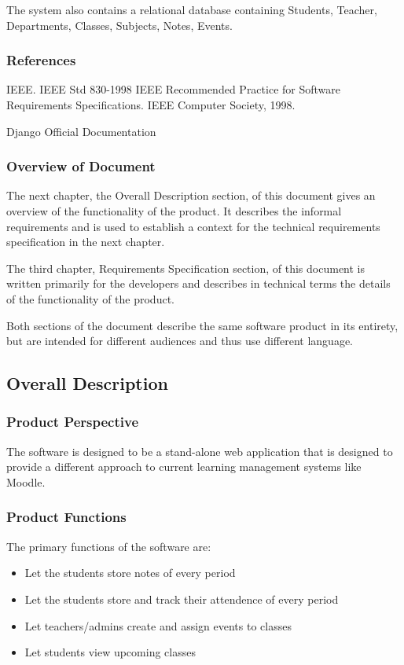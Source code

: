 The system also contains a relational database containing Students, Teacher, Departments, Classes, Subjects, Notes, Events.

\subsubsection{References}
IEEE. IEEE Std 830-1998 IEEE Recommended Practice for Software Requirements Specifications. IEEE Computer Society, 1998.

Django Official Documentation

\subsubsection{Overview of Document}
The next chapter, the Overall Description section, of this document gives an overview of the functionality of the product. It describes the informal requirements and is used to establish a context for the technical requirements specification in the next chapter.

The third chapter, Requirements Specification section, of this document is written primarily for the developers and describes in technical terms the details of the functionality of the product. 

Both sections of the document describe the same software product in its entirety, but are intended for different audiences and thus use different language.

\subsection{Overall Description}

\subsubsection{Product Perspective}
The software is designed to be a stand-alone web application that is designed to provide a different approach to current learning management systems like Moodle.

\subsubsection{Product Functions}
The primary functions of the software are:
\begin{itemize}
\item Let the students store notes of every period
\item Let the students store and track their attendence of every period
\item Let teachers/admins create and assign events to classes
\item Let students view upcoming classes
\end{itemize}

